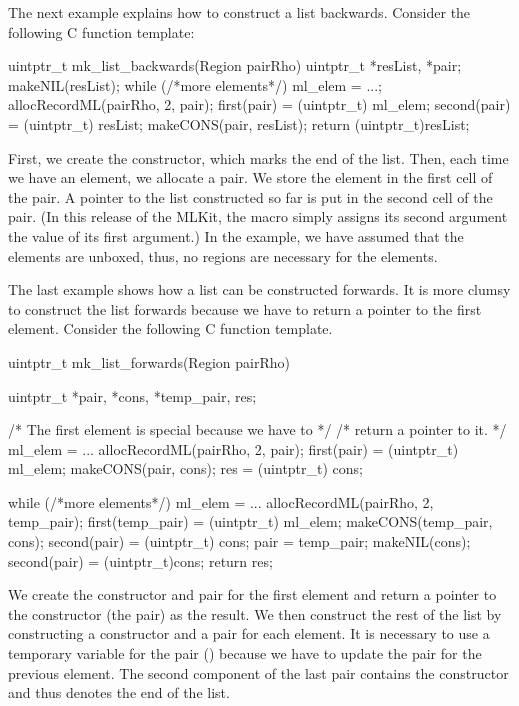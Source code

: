 \documentclass[12pt]{book}
\begin{document}
The next example explains how to construct a list backwards. Consider the
following C function template:
%
%
%
\begin{scriptcode}
  uintptr_t mk_list_backwards(Region pairRho) {
    uintptr_t *resList, *pair;
    makeNIL(resList);
    while (/*more elements*/) {
      ml_elem = ...;
      allocRecordML(pairRho, 2, pair);
      first(pair) = (uintptr_t) ml_elem;
      second(pair) = (uintptr_t) resList;
      makeCONS(pair, resList);
    }
    return (uintptr_t)resList;
  }
\end{scriptcode}
First, we create the  constructor, which marks the end of the
list. Then, each time we have an element, we allocate a pair. We store the
element in the first cell of the pair. A pointer to the list constructed so far
is put in the second cell of the pair. (In this release of the MLKit, the
 macro simply assigns its second argument the value of its first
argument.) In the example, we have assumed that the elements are unboxed, thus,
no regions are necessary for the elements.

The last example shows how a list can be constructed forwards. It is more clumsy
to construct the list forwards because we have to return a pointer to the first
element. Consider the following C function template.
%
%
%
\begin{scriptcode}
  uintptr_t mk_list_forwards(Region pairRho) {
    uintptr_t *pair, *cons, *temp_pair, res;

    /* The first element is special because we have to    */
    /* return a pointer to it.                            */
    ml_elem = ...
    allocRecordML(pairRho, 2, pair);
    first(pair) = (uintptr_t) ml_elem;
    makeCONS(pair, cons);
    res = (uintptr_t) cons;

    while (/*more elements*/) {
      ml_elem = ...
      allocRecordML(pairRho, 2, temp_pair);
      first(temp_pair) = (uintptr_t) ml_elem;
      makeCONS(temp_pair, cons);
      second(pair) = (uintptr_t) cons;
      pair = temp_pair;
    }
    makeNIL(cons);
    second(pair) = (uintptr_t)cons;
    return res;
  }
\end{scriptcode}

We create the  constructor and pair for the first element and return a
pointer to the  constructor (the pair) as the result. We then construct
the rest of the list by constructing a  constructor and a pair for each
element. It is necessary to use a temporary variable for the pair
() because we have to update the pair for the previous
element. The second component of the last pair contains the  constructor
and thus denotes the end of the list.
\end{document}

